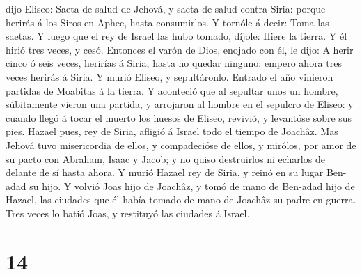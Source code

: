 dijo Eliseo: Saeta de salud de Jehová, y saeta de salud contra Siria:
porque herirás á los Siros en Aphec, hasta consumirlos. 
Y tornóle á decir: Toma las saetas. Y luego que el rey de Israel las
hubo tomado, díjole: Hiere la tierra. Y él hirió tres veces, y cesó.
 Entonces el varón de Dios, enojado con él, le dijo: A
herir cinco ó seis veces, herirías á Siria, hasta no quedar ninguno:
empero ahora tres veces herirás á Siria.  Y murió Eliseo,
y sepultáronlo. Entrado el año vinieron partidas de Moabitas á la
tierra.  Y aconteció que al sepultar unos un hombre,
súbitamente vieron una partida, y arrojaron al hombre en el sepulcro de
Eliseo: y cuando llegó á tocar el muerto los huesos de Eliseo, revivió,
y levantóse sobre sus pies.  Hazael pues, rey de Siria,
afligió á Israel todo el tiempo de Joachâz.  Mas Jehová
tuvo misericordia de ellos, y compadecióse de ellos, y mirólos, por amor
de su pacto con Abraham, Isaac y Jacob; y no quiso destruirlos ni
echarlos de delante de sí hasta ahora.  Y murió Hazael
rey de Siria, y reinó en su lugar Ben-adad su hijo.  Y
volvió Joas hijo de Joachâz, y tomó de mano de Ben-adad hijo de Hazael,
las ciudades que él había tomado de mano de Joachâz su padre en guerra.
Tres veces lo batió Joas, y restituyó las ciudades á Israel.

\hypertarget{section-13}{%
\section{14}\label{section-13}}

